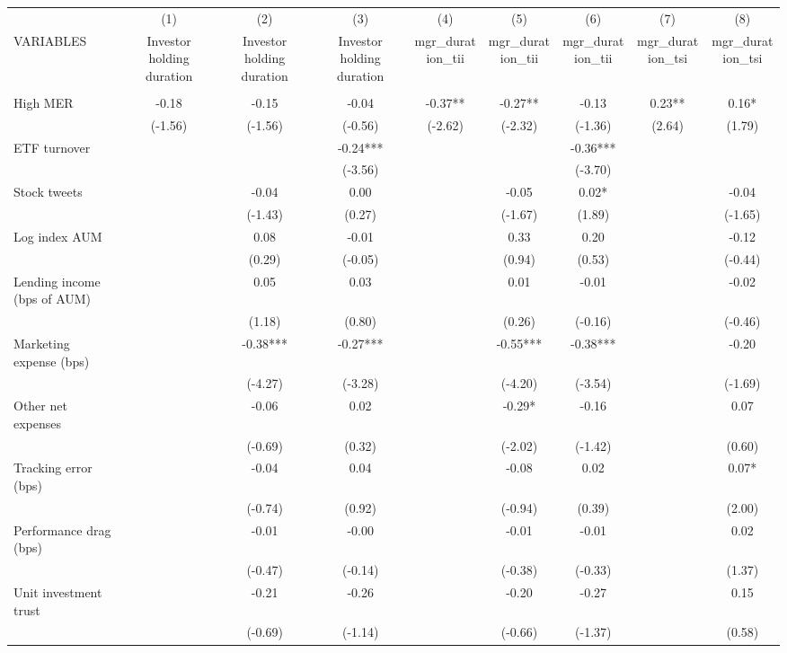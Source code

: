 \documentclass[]{article}
\begin{document}
\begin{tabular}{lcccccccc} \hline
 & (1) & (2) & (3) & (4) & (5) & (6) & (7) & (8) \\
VARIABLES & Investor holding duration & Investor holding duration & Investor holding duration & mgr\_duration\_tii & mgr\_duration\_tii & mgr\_duration\_tii & mgr\_duration\_tsi & mgr\_duration\_tsi \\ \hline
 &  &  &  &  &  &  &  &  \\
High MER & -0.18 & -0.15 & -0.04 & -0.37** & -0.27** & -0.13 & 0.23** & 0.16* \\
 & (-1.56) & (-1.56) & (-0.56) & (-2.62) & (-2.32) & (-1.36) & (2.64) & (1.79) \\
ETF turnover &  &  & -0.24*** &  &  & -0.36*** &  &  \\
 &  &  & (-3.56) &  &  & (-3.70) &  &  \\
Stock tweets &  & -0.04 & 0.00 &  & -0.05 & 0.02* &  & -0.04 \\
 &  & (-1.43) & (0.27) &  & (-1.67) & (1.89) &  & (-1.65) \\
Log index AUM &  & 0.08 & -0.01 &  & 0.33 & 0.20 &  & -0.12 \\
 &  & (0.29) & (-0.05) &  & (0.94) & (0.53) &  & (-0.44) \\
Lending income (bps of AUM) &  & 0.05 & 0.03 &  & 0.01 & -0.01 &  & -0.02 \\
 &  & (1.18) & (0.80) &  & (0.26) & (-0.16) &  & (-0.46) \\
Marketing expense (bps) &  & -0.38*** & -0.27*** &  & -0.55*** & -0.38*** &  & -0.20 \\
 &  & (-4.27) & (-3.28) &  & (-4.20) & (-3.54) &  & (-1.69) \\
Other net expenses &  & -0.06 & 0.02 &  & -0.29* & -0.16 &  & 0.07 \\
 &  & (-0.69) & (0.32) &  & (-2.02) & (-1.42) &  & (0.60) \\
Tracking error (bps) &  & -0.04 & 0.04 &  & -0.08 & 0.02 &  & 0.07* \\
 &  & (-0.74) & (0.92) &  & (-0.94) & (0.39) &  & (2.00) \\
Performance drag (bps) &  & -0.01 & -0.00 &  & -0.01 & -0.01 &  & 0.02 \\
 &  & (-0.47) & (-0.14) &  & (-0.38) & (-0.33) &  & (1.37) \\
Unit investment trust &  & -0.21 & -0.26 &  & -0.20 & -0.27 &  & 0.15 \\
 &  & (-0.69) & (-1.14) &  & (-0.66) & (-1.37) &  & (0.58) \\

\end{tabular}
\end{document}
